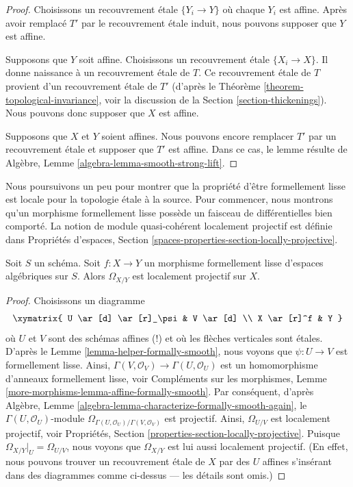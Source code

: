 \begin{proof}
Choisissons un recouvrement étale $\{Y_i \to Y\}$ où chaque $Y_i$ est affine.
Après avoir remplacé $T'$ par le recouvrement étale induit, nous pouvons supposer
que $Y$ est affine.

\medskip\noindent
Supposons que $Y$ soit affine. Choisissons un recouvrement étale $\{X_i \to X\}$.
Il donne naissance à un recouvrement étale de $T$. Ce recouvrement étale de $T$
provient d'un recouvrement étale de $T'$
(d'après le Théorème \ref{theorem-topological-invariance}, voir la
discussion de la Section \ref{section-thickenings}).
Nous pouvons donc supposer que $X$ est affine.

\medskip\noindent
Supposons que $X$ et $Y$ soient affines. Nous pouvons encore remplacer
$T'$ par un recouvrement étale et supposer que $T'$ est affine. Dans ce cas, le lemme résulte de
Algèbre, Lemme \ref{algebra-lemma-smooth-strong-lift}.
\end{proof}







\noindent
Nous poursuivons un peu pour montrer que la propriété d'être formellement lisse est locale
pour la topologie étale à la source. Pour commencer, nous montrons qu'un morphisme formellement lisse possède un
faisceau de différentielles bien comporté. La notion de module quasi-cohérent
localement projectif est définie dans
Propriétés d'espaces,
Section \ref{spaces-properties-section-locally-projective}.

\begin{lemma}
\label{lemma-formally-smooth-sheaf-differentials}
Soit $S$ un schéma.
Soit $f : X \to Y$ un morphisme formellement lisse d'espaces algébriques sur $S$.
Alors $\Omega_{X/Y}$ est localement projectif sur $X$.
\end{lemma}

\begin{proof}
Choisissons un diagramme
$$
\xymatrix{
U \ar[d] \ar[r]_\psi & V \ar[d] \\
X \ar[r]^f & Y
}
$$
où $U$ et $V$ sont des schémas affines (!) et où les flèches verticales sont étales.
D'après le
Lemme \ref{lemma-helper-formally-smooth},
nous voyons que $\psi : U \to V$ est formellement lisse. Ainsi,
$\Gamma(V, \mathcal{O}_V) \to \Gamma(U, \mathcal{O}_U)$ est
un homomorphisme d'anneaux formellement lisse, voir
Compléments sur les morphismes, Lemme \ref{more-morphisms-lemma-affine-formally-smooth}.
Par conséquent, d'après
Algèbre, Lemme \ref{algebra-lemma-characterize-formally-smooth-again},
le $\Gamma(U, \mathcal{O}_U)$-module
$\Omega_{\Gamma(U, \mathcal{O}_U)/\Gamma(V, \mathcal{O}_V)}$
est projectif. Ainsi, $\Omega_{U/V}$ est localement projectif, voir
Propriétés, Section \ref{properties-section-locally-projective}.
Puisque $\Omega_{X/Y}|_U = \Omega_{U/V}$, nous voyons que $\Omega_{X/Y}$ est
lui aussi localement projectif. (En effet, nous pouvons trouver un recouvrement étale de
$X$ par des $U$ affines s'insérant dans des diagrammes comme ci-dessus --- les détails sont
omis.)
\end{proof}


